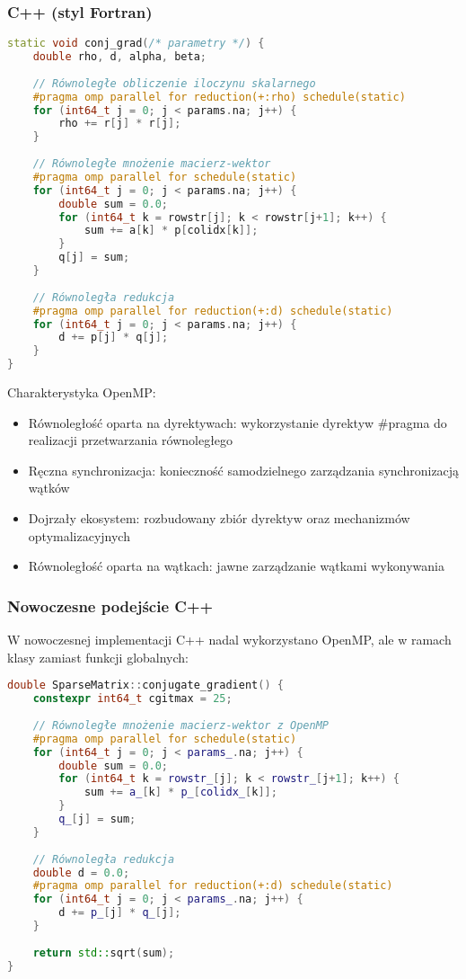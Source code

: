 \subsubsection{C++ (styl Fortran)}
\begin{lstlisting}[language=C++, caption={Równoległość w C++ (styl Fortran)}, label={lst:cg_cpp_parallelism}]
static void conj_grad(/* parametry */) {
    double rho, d, alpha, beta;
    
    // Równoległe obliczenie iloczynu skalarnego
    #pragma omp parallel for reduction(+:rho) schedule(static)
    for (int64_t j = 0; j < params.na; j++) {
        rho += r[j] * r[j];
    }
    
    // Równoległe mnożenie macierz-wektor
    #pragma omp parallel for schedule(static)
    for (int64_t j = 0; j < params.na; j++) {
        double sum = 0.0;
        for (int64_t k = rowstr[j]; k < rowstr[j+1]; k++) {
            sum += a[k] * p[colidx[k]];
        }
        q[j] = sum;
    }
    
    // Równoległa redukcja
    #pragma omp parallel for reduction(+:d) schedule(static)
    for (int64_t j = 0; j < params.na; j++) {
        d += p[j] * q[j];
    }
}
\end{lstlisting}
Charakterystyka OpenMP:
\begin{itemize}
    \item Równoległość oparta na dyrektywach: wykorzystanie dyrektyw \#pragma do realizacji przetwarzania równoległego
    \item Ręczna synchronizacja: konieczność samodzielnego zarządzania synchronizacją wątków
    \item Dojrzały ekosystem: rozbudowany zbiór dyrektyw oraz mechanizmów optymalizacyjnych
    \item Równoległość oparta na wątkach: jawne zarządzanie wątkami wykonywania
\end{itemize}

\subsubsection{Nowoczesne podejście C++}
W nowoczesnej implementacji C++ nadal wykorzystano OpenMP, ale w ramach klasy zamiast funkcji globalnych:
\begin{lstlisting}[language=C++, caption={Równoległość w nowoczesnym C++}, label={lst:cg_modern_cpp_parallelism}]
double SparseMatrix::conjugate_gradient() {
    constexpr int64_t cgitmax = 25;
    
    // Równoległe mnożenie macierz-wektor z OpenMP
    #pragma omp parallel for schedule(static)
    for (int64_t j = 0; j < params_.na; j++) {
        double sum = 0.0;
        for (int64_t k = rowstr_[j]; k < rowstr_[j+1]; k++) {
            sum += a_[k] * p_[colidx_[k]];
        }
        q_[j] = sum;
    }
    
    // Równoległa redukcja
    double d = 0.0;
    #pragma omp parallel for reduction(+:d) schedule(static)
    for (int64_t j = 0; j < params_.na; j++) {
        d += p_[j] * q_[j];
    }
    
    return std::sqrt(sum);
}
\end{lstlisting}

